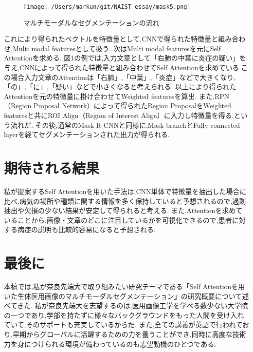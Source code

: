 \documentclass[a4j,10pt, twocolumn]{jarticle}
\begin{document}
\begin{figure}[ht]%
    \texttt{[image: /Users/markun/git/NAIST\_essay/mask5.png]}
    \caption{マルチモーダルなセグメンテーションの流れ}
\end{figure}

これにより得られたベクトルを特徴量として,CNNで得られた特徴量と組み合わせ,Multi modal featuresとして扱う.
次はMulti modal featuresを元にSelf Attentionを求める.
図1の例では,入力文章として「右肺の中葉に炎症の疑い」を与え,CNNによって得られた特徴量と組み合わせてSelf Attentionを求めている.この場合入力文章のAttentionは「右肺」,「中葉」,「炎症」などで大きくなり,「の」,「に」,「疑い」などで小さくなると考えられる.
以上により得られたAttentionを元の特徴量に掛け合わせてWeighted featuresを算出.
また,RPN（Region Proposal Network）\cite{ren2015faster}によって得られたRegion ProposalをWeighted featuresと共にROI Align（Region of Interest Align）に入力し特徴量を得る,という流れだ.
その後,通常のMask R-CNNと同様に,Mask branchとFully connected layerを経てセグメンテーションされた出力が得られる.
\section{期待される結果}
私が提案するSelf Attentionを用いた手法は,CNN単体で特徴量を抽出した場合に比べ,病気の場所や種類に関する情報を多く保持していると予想されるので,過剰抽出や欠損の少ない結果が安定して得られると考える.
また,Attentionを求めていることから,画像・文章のどこに注目しているかを可視化できるので,患者に対する病症の説明も比較的容易になると予想される.

\section{最後に}
本稿では,私が奈良先端大で取り組みたい研究テーマである「Self Attentionを用いた生体医用画像のマルチモーダルセグメンテーション」の研究概要について述べてきた.
私が奈良先端大を志望するのは,医用画像工学を学べる数少ない大学院の一つであり,学部を持たずに様々なバックグラウンドをもった人間を受け入れていて,そのサポートも充実しているからだ.
また,全ての講義が英語で行われており,早期からグローバルに活躍するための力を養うことができ,同時に高度な技術力を身につけられる環境が備わっているのも志望動機のひとつである.



\end{document}
